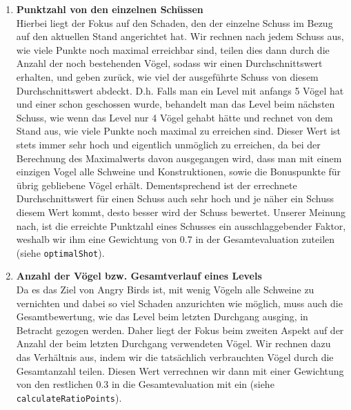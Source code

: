 \begin{table}[H]
\begin{enumerate}
\item \textbf{Punktzahl von den einzelnen Schüssen} \\
Hierbei liegt der Fokus auf den Schaden, den der einzelne Schuss im Bezug auf den aktuellen Stand angerichtet hat. Wir rechnen nach jedem Schuss aus, wie viele Punkte noch maximal erreichbar sind, teilen dies dann durch die Anzahl der noch bestehenden Vögel, sodass wir einen Durchschnittswert erhalten, und geben zurück, wie viel der ausgeführte Schuss von diesem Durchschnittswert abdeckt. D.h. Falls man ein Level mit anfangs 5 Vögel hat und einer schon geschossen wurde, behandelt man das Level beim nächsten Schuss, wie wenn das Level nur 4 Vögel gehabt hätte und rechnet von dem Stand aus, wie viele Punkte noch maximal zu erreichen sind. Dieser Wert ist stets immer sehr hoch und eigentlich unmöglich zu erreichen, da bei der Berechnung des Maximalwerts davon ausgegangen wird, dass man mit einem einzigen Vogel alle Schweine und Konstruktionen, sowie die Bonuspunkte für übrig gebliebene Vögel erhält. Dementsprechend ist der errechnete Durchschnittswert für einen Schuss auch sehr hoch und je näher ein Schuss diesem Wert kommt, desto besser wird der Schuss bewertet. Unserer Meinung nach, ist die erreichte Punktzahl eines Schusses ein ausschlaggebender Faktor, weshalb wir ihm eine Gewichtung von 0.7 in der Gesamtevaluation zuteilen (siehe \texttt{optimalShot}). \\
\item \textbf{Anzahl der Vögel bzw. Gesamtverlauf eines Levels} \\
Da es das Ziel von Angry Birds ist, mit wenig Vögeln alle Schweine zu vernichten und dabei so viel Schaden anzurichten wie möglich, muss auch die Gesamtbewertung, wie das Level beim letzten Durchgang ausging, in Betracht gezogen werden. Daher liegt der Fokus beim zweiten Aspekt auf der Anzahl der beim letzten Durchgang verwendeten Vögel. Wir rechnen dazu das Verhältnis aus, indem wir die tatsächlich verbrauchten Vögel durch die Gesamtanzahl teilen. Diesen Wert verrechnen wir dann mit einer Gewichtung von den restlichen 0.3 in die Gesamtevaluation mit ein (siehe \texttt{calculateRatioPoints}).
\end{enumerate}
\end{table}

